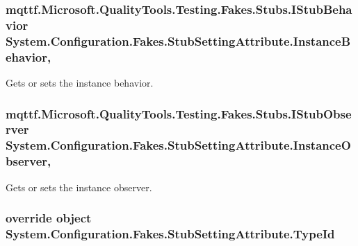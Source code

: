 \hypertarget{class_system_1_1_configuration_1_1_fakes_1_1_stub_setting_attribute_acd2fecb54a0b95f80421f7609b71c882}{
\subsubsection[{Instance\-Behavior}]{\setlength{\rightskip}{0pt plus 5cm}mqttf.\-Microsoft.\-Quality\-Tools.\-Testing.\-Fakes.\-Stubs.\-I\-Stub\-Behavior System.\-Configuration.\-Fakes.\-Stub\-Setting\-Attribute.\-Instance\-Behavior\hspace{0.3cm}{\ttfamily [get]}, {\ttfamily [set]}}}\label{class_system_1_1_configuration_1_1_fakes_1_1_stub_setting_attribute_acd2fecb54a0b95f80421f7609b71c882}


Gets or sets the instance behavior.

\hypertarget{class_system_1_1_configuration_1_1_fakes_1_1_stub_setting_attribute_ad63a3da1277ad992706ec84a256878ea}{
\subsubsection[{Instance\-Observer}]{\setlength{\rightskip}{0pt plus 5cm}mqttf.\-Microsoft.\-Quality\-Tools.\-Testing.\-Fakes.\-Stubs.\-I\-Stub\-Observer System.\-Configuration.\-Fakes.\-Stub\-Setting\-Attribute.\-Instance\-Observer\hspace{0.3cm}{\ttfamily [get]}, {\ttfamily [set]}}}\label{class_system_1_1_configuration_1_1_fakes_1_1_stub_setting_attribute_ad63a3da1277ad992706ec84a256878ea}


Gets or sets the instance observer.

\hypertarget{class_system_1_1_configuration_1_1_fakes_1_1_stub_setting_attribute_a2f5d40ad7634f731f2a8fd0fc068c35e}{
\subsubsection[{Type\-Id}]{\setlength{\rightskip}{0pt plus 5cm}override object System.\-Configuration.\-Fakes.\-Stub\-Setting\-Attribute.\-Type\-Id\hspace{0.3cm}{\ttfamily [get]}}}\label{class_system_1_1_configuration_1_1_fakes_1_1_stub_setting_attribute_a2f5d40ad7634f731f2a8fd0fc068c35e}


